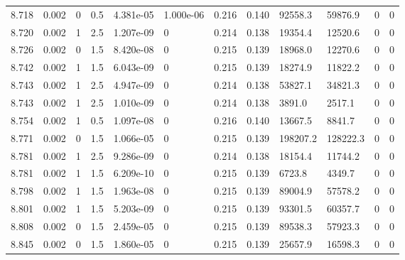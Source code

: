 \documentclass[preview]{standalone}
\begin{document}
{{{{{{{{{{{{{{{\begin{tabular}{L{1.2cm}C{1.2cm} C{0.3cm}C{0.5cm} C{1.4cm}C{1.4cm} C{1.4cm}C{1.4cm} C{1.6cm}C{1.6cm} C{1.6cm}C{1.6cm}}
  8.718  &  0.002  & 0     & 0.5 &  4.381e-05  & 1.000e-06  &  0.216&   0.140& 92558.3 & 59876.9   &  0 & 0  \\ 
  8.720  &  0.002  & 1     & 2.5 &  1.207e-09  & 0  &  0.214&   0.138& 19354.4 & 12520.6   &  0 & 0  \\ 
  8.726  &  0.002  & 0     & 1.5 &  8.420e-08  & 0  &  0.215&   0.139& 18968.0 & 12270.6   &  0 & 0  \\ 
  8.742  &  0.002  & 1     & 1.5 &  6.043e-09  & 0  &  0.215&   0.139& 18274.9 & 11822.2   &  0 & 0  \\ 
  8.743  &  0.002  & 1     & 2.5 &  4.947e-09  & 0  &  0.214&   0.138& 53827.1 & 34821.3   &  0 & 0  \\ 
  8.743  &  0.002  & 1     & 2.5 &  1.010e-09  & 0  &  0.214&   0.138& 3891.0 & 2517.1   &  0 & 0  \\ 
  8.754  &  0.002  & 1     & 0.5 &  1.097e-08  & 0  &  0.216&   0.140& 13667.5 & 8841.7   &  0 & 0  \\ 
  8.771  &  0.002  & 0     & 1.5 &  1.066e-05  & 0  &  0.215&   0.139& 198207.2 & 128222.3   &  0 & 0  \\ 
  8.781  &  0.002  & 1     & 2.5 &  9.286e-09  & 0  &  0.214&   0.138& 18154.4 & 11744.2   &  0 & 0  \\ 
  8.781  &  0.002  & 1     & 1.5 &  6.209e-10  & 0  &  0.215&   0.139& 6723.8 & 4349.7   &  0 & 0  \\ 
  8.798  &  0.002  & 1     & 1.5 &  1.963e-08  & 0  &  0.215&   0.139& 89004.9 & 57578.2   &  0 & 0  \\ 
  8.801  &  0.002  & 1     & 1.5 &  5.203e-09  & 0  &  0.215&   0.139& 93301.5 & 60357.7   &  0 & 0  \\ 
  8.808  &  0.002  & 0     & 1.5 &  2.459e-05  & 0  &  0.215&   0.139& 89538.3 & 57923.3   &  0 & 0  \\ 
  8.845  &  0.002  & 0     & 1.5 &  1.860e-05  & 0  &  0.215&   0.139& 25657.9 & 16598.3   &  0 & 0  \\ 
\hline 
\end{tabular} 

}}}}}}}}}}}}}}}
\end{document}
